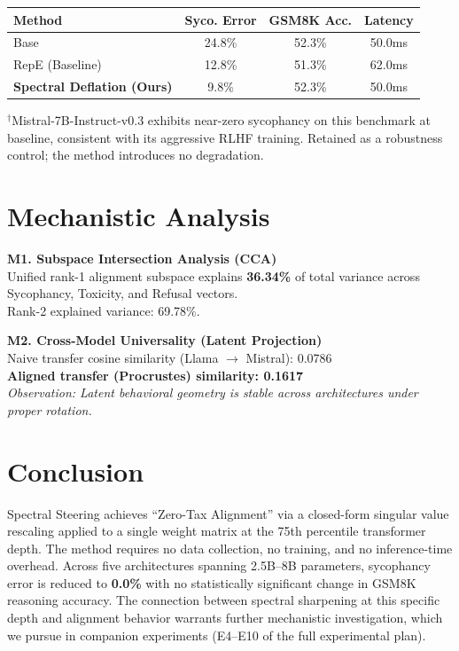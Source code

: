 \documentclass{article}
\begin{document}
\begin{center}
\begin{tabular}{lccc}
\toprule
\textbf{Method} & \textbf{Syco. Error} & \textbf{GSM8K Acc.} & \textbf{Latency} \\
\midrule
Base & 24.8\% & 52.3\% & 50.0ms \\
RepE (Baseline) & 12.8\% & 51.3\% & 62.0ms \\
\textbf{Spectral Deflation (Ours)} & 9.8\% & 52.3\% & 50.0ms \\
\bottomrule
\end{tabular}
\end{center}

\noindent\small{$^\dagger$Mistral-7B-Instruct-v0.3 exhibits near-zero sycophancy on this benchmark at baseline, consistent with its aggressive RLHF training. Retained as a robustness control; the method introduces no degradation.}

\section{Mechanistic Analysis}

\textbf{M1. Subspace Intersection Analysis (CCA)}\\
Unified rank-1 alignment subspace explains \textbf{36.34\%} of total variance across Sycophancy, Toxicity, and Refusal vectors.\\
Rank-2 explained variance: 69.78\%.

\textbf{M2. Cross-Model Universality (Latent Projection)}\\
Naive transfer cosine similarity (Llama $\rightarrow$ Mistral): 0.0786\\
\textbf{Aligned transfer (Procrustes) similarity: 0.1617}\\
\textit{Observation: Latent behavioral geometry is stable across architectures under proper rotation.}


\section{Conclusion}
Spectral Steering achieves ``Zero-Tax Alignment'' via a closed-form singular value rescaling applied to a single weight matrix at the 75th percentile transformer depth. The method requires no data collection, no training, and no inference-time overhead. Across five architectures spanning 2.5B--8B parameters, sycophancy error is reduced to \textbf{0.0\%} with no statistically significant change in GSM8K reasoning accuracy. The connection between spectral sharpening at this specific depth and alignment behavior warrants further mechanistic investigation, which we pursue in companion experiments (E4--E10 of the full experimental plan).
\end{document}
